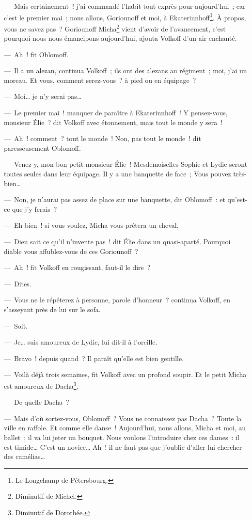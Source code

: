 \documentclass[french,twoside]{book} %
\begin{document}
— Mais certainement ! j’ai commandé l’habit tout exprès pour aujourd’hui ; car c’est le premier mai ; nous allons, Goriounoff et moi, à Ekaterinnhoff\footnote{Le Longchamp de Pétersbourg.}. À propos, vous ne savez pas ? Goriounoff Micha\footnote{Diminutif de Michel.} vient d’avoir de l’avancement, c’est pourquoi nous nous émancipons aujourd’hui, ajouta Volkoff d’un air enchanté.\par
— Ah ! fit Oblomoff.\par
— Il a un alezan, continua Volkoff ; ils ont des alezans au régiment ; moi, j’ai un moreau. Et vous, comment serez-vous ? à pied ou en équipage ?\par
— Moi… je n’y serai pas…\par
— Le premier mai ! manquer de paraître à Ekaterinnhoff ! Y pensez-vous, monsieur Élie ? dit Volkoff avec étonnement, mais tout le monde y sera !\par
— Ah ! comment ? tout le monde ! Non, pas tout le monde ! dit paresseusement Oblomoff.\par
— Venez-y, mon bon petit monsieur Élie ! Mesdemoiselles Sophie et Lydie seront toutes seules dans leur équipage. Il y a une banquette de face ; Vous pouvez très-bien…\par
— Non, je n’aurai pas assez de place sur une banquette, dit Oblomoff : et qu’est-ce que j’y ferais ?\par
— Eh bien ! si vous voulez, Micha vous prêtera un cheval.\par
— Dieu sait ce qu’il n’invente pas ! dit Élie dans un quasi-aparté. Pourquoi diable vous affublez-vous de ces Goriounoff ?\par
— Ah ! fit Volkoff en rougissant, faut-il le dire ?\par
— Dites.\par
— Vous ne le répéterez à personne, parole d’honneur ? continua Volkoff, en s’asseyant près de lui sur le sofa.\par
— Soit.\par
— Je… suis amoureux de Lydie, lui dit-il à l’oreille.\par
— Bravo ! depuis quand ? Il paraît qu’elle est bien gentille.\par
— Voilà déjà trois semaines, fit Volkoff avec un profond soupir. Et le petit Micha est amoureux de Dacha\footnote{Diminutif de Dorothée.}.\par
— De quelle Dacha ?\par
— Mais d’où sortez-vous, Oblomoff ? Vous ne connaissez pas Dacha ? Toute la ville en raffole. Et comme elle danse ! Aujourd’hui, nous allons, Micha et moi, au ballet ; il va lui jeter un bouquet. Nous voulons l’introduire chez ces dames : il est timide… C’est un novice… Ah ! il ne faut pas que j’oublie d’aller lui chercher des camélias…\par
\end{document}
